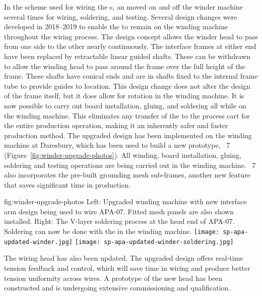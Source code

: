 In the scheme used for wiring the  s, an  moved on and off the winder machine several times for wiring, soldering, and testing. %
 Several design changes were developed in 2018--2019 to enable the  to remain on the winding machine throughout the wiring process. The design concept allows the winder head to pass from one side to the other nearly continuously. The interface frames at either end have been replaced by retractable linear guided shafts. These can be withdrawn to allow the winding head to pass around the frame over the full height of the frame. These shafts have conical ends and are in shafts fixed to the internal frame tube to provide guides to location. This design change does not alter the design of the frame itself, but it does allow for rotation in the winding machine. It is now possible to carry out board installation, gluing, and soldering all while on the winding machine. This eliminates any transfer of the  to the process cart for the entire production operation, making it an inherently safer and faster production method.%
 The upgraded design has been implemented on the winding machine at Daresbury, which has been used to build a new prototype, ~7 (Figure~\ref{fig:winder-upgrade-photos}). All winding, board installation, gluing, soldering and testing operations are being carried out in the winding machine. ~7 also incorporates the pre-built grounding mesh sub-frames, another new feature %
 that saves significant time in production.  

\begin{dunefigure}{fig:winder-upgrade-photos}
{Left: Upgraded winding machine with new interface arm design being used to wire APA-07. Fitted mesh panels are also shown installed. Right: The V-layer soldering process at the head end of APA-07. Soldering can now be done with the  in the winding machine.}
\texttt{[image: sp-apa-updated-winder.jpg]} 
\texttt{[image: sp-apa-updated-winder-soldering.jpg]}
\end{dunefigure}

The wiring head has also been updated. The upgraded design offers real-time tension feedback and control, which will save time in wiring and produce better tension uniformity across wires.  A prototype of the new head has been constructed and is undergoing extensive commissioning and qualification.   

